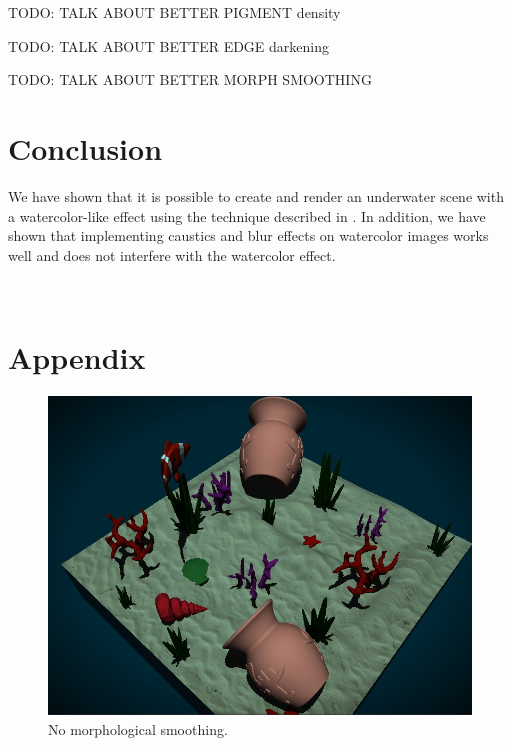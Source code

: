 \documentclass{article}
\begin{document}
TODO: TALK ABOUT BETTER PIGMENT density

TODO: TALK ABOUT BETTER EDGE darkening

TODO: TALK ABOUT BETTER MORPH SMOOTHING

\newpage
\section{Conclusion}
We have shown that it is possible to create and render an underwater scene with a watercolor-like effect using the technique described in \cite{watercolor_paper}. In addition, we have shown that implementing caustics and blur effects on watercolor images works well and does not interfere with the watercolor effect.

\newpage~\newpage
\section{Appendix}
\label{sec:appendix}

\begin{figure}[h]
    \centering
    \includegraphics[width=\columnwidth]{imgs/no_smoothing_2.jpg}
    \caption{No morphological smoothing.}
    \label{fig:no_ms}
\end{figure}

\vspace{5em}
\end{document}
